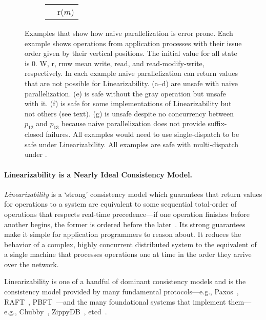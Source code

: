 \begin{figure*}
\begin{minipage}{.175\linewidth}
\begin{subfigure}[t]{.175\linewidth}
\begin{center}
\begin{tabular}{ l l }
        & r($m$)\\
\end{tabular}
\caption{}%
\label{subfig:suffix_closed_breaks}
\end{center}
\end{subfigure}
\end{minipage}
\caption{Examples that show how naive parallelization is error prone. Each example shows operations from application processes with their issue order given by their vertical positions. The initial value for all state is 0. W, r, rmw mean write, read, and read-modify-write, respectively. In each example naive parallelization can return values that are not possible for Linearizability. (a--d) are unsafe with naive parallelization.  (e) is safe without the gray operation but unsafe with it. (f) is safe for some implementations of Linearizability but not others (see text). (g) is unsafe despite no concurrency between $p_{12}$ and $p_{13}$ because naive parallelization does not provide suffix-closed failures. All examples would need to use single-dispatch to be safe under Linearizability. All examples
are safe with multi-dispatch under \mdl{}.}
\label{fig:naive_breaks_stuff}
\end{figure*}

\paragraph{Linearizability is a Nearly Ideal Consistency Model.}
\textit{Linearizability} is a `strong' consistency model which guarantees that return values for operations to a system are equivalent to some sequential total-order of operations that respects real-time precedence---if one operation finishes before another begins, the former is ordered before the later~\cite{herlihy1987linearizability, herlihy1990linearizability}.
Its strong guarantees make it simple for application programmers to reason about. It reduces the behavior of a complex, highly concurrent distributed system to the equivalent of a single machine that processes operations one at time in the order they arrive over the network. 

Linearizability is one of a handful of dominant consistency models and is the consistency model provided by many fundamental protocols---e.g., Paxos~\cite{lamport1998paxos}, RAFT~\cite{ongaro2014raft}, PBFT~\cite{castro1999pbft}---and the many foundational systems that implement them---e.g., Chubby~\cite{burrows2006chubby}, ZippyDB~\cite{zippyblog}, etcd~\cite{etcd}.

